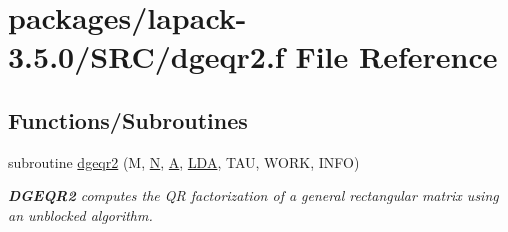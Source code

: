 \hypertarget{dgeqr2_8f}{}\section{packages/lapack-\/3.5.0/\+S\+R\+C/dgeqr2.f File Reference}
\label{dgeqr2_8f}
\subsection*{Functions/\+Subroutines}
\begin{DoxyCompactItemize}
\item 
subroutine \hyperlink{group__doubleGEcomputational_ga86586a8c4f1c31707724ed70e92f6f34}{dgeqr2} (M, \hyperlink{polmisc_8c_a0240ac851181b84ac374872dc5434ee4}{N}, \hyperlink{classA}{A}, \hyperlink{example__user_8c_ae946da542ce0db94dced19b2ecefd1aa}{L\+D\+A}, T\+A\+U, W\+O\+R\+K, I\+N\+F\+O)
\begin{DoxyCompactList}\small\item\em {\bfseries D\+G\+E\+Q\+R2} computes the Q\+R factorization of a general rectangular matrix using an unblocked algorithm. \end{DoxyCompactList}\end{DoxyCompactItemize}
